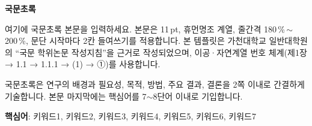 \clearpage
\thispagestyle{plain}

\begin{center}
{\fontsize{16pt}{22pt}\selectfont\bfseries 국문초록\par}

\vspace{8mm}

{\fontsize{14pt}{20pt}\selectfont\bfseries \ThesisTitleKR\par}
\end{center}

\vspace{6mm}

\begin{flushright}
{\fontsize{12pt}{18pt}\selectfont
\AuthorKRPlain\par
\DepartmentKR\par
\GraduateSchoolKR\par}
\end{flushright}

\vspace{8mm}


여기에 국문초록 본문을 입력하세요. 본문은 11\,pt, 휴먼명조 계열, 줄간격
180\,\%\,$\sim$\,200\,\%, 문단 시작마다 2칸 들여쓰기를 적용합니다. 본 템플릿은
가천대학교 일반대학원의 ``국문 학위논문 작성지침''을 근거로 작성되었으며,
이공·자연계열 번호 체계(제1장 → 1.1 → 1.1.1 → (1) → ①)를 사용합니다.

국문초록은 연구의 배경과 필요성, 목적, 방법, 주요 결과, 결론을 2쪽
이내로 간결하게 기술합니다. 본문 마지막에는 핵심어를 7$\sim$8단어 이내로
기입합니다.

\vfill

\noindent\textbf{핵심어}: 키워드1, 키워드2, 키워드3, 키워드4, 키워드5, 키워드6, 키워드7

\clearpage
